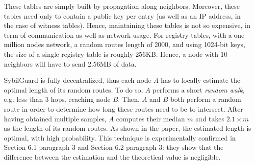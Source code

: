 \documentclass[a4paper,11pt]{article}
\begin{document}
These tables are simply built by propagation along neighbors.
Moreover, these tables need only to contain a public key per entry (as
well as an IP address, in the case of witness tables). Hence,
maintaining these tables is not so expensive, in term of communication
as well as network usage.  For registry tables, with a one million
nodes network, a random routes length of 2000, and using 1024-bit
keys, the size of a single registry table is roughly 256KB.  Hence, a
node with 10 neighbors will have to send 2.56MB of data.


SybilGuard is fully decentralized, thus each node $A$ has to locally
estimate the optimal length of its random routes.  To do so, $A$
performs a short \emph{random walk}, e.g. less than 3 hops, reaching
node $B$. Then, $A$ and $B$ both perform a random route in order to
determine how long these routes need to be to intersect.  After having
obtained multiple samples, $A$ computes their median $m$ and takes
$2.1 \times m$ as the length of its random routes. As shown in the
paper, the estimated length is optimal, with high probability. This
technique is experimentally confirmed in Section 6.1 paragraph 3 and
Section 6.2 paragraph 3: they show that the difference between the
estimation and the theoretical value is negligible.

\end{document}
